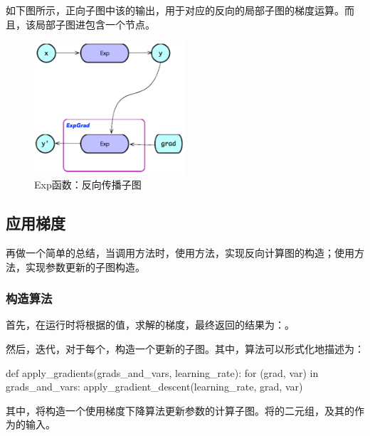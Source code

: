 \begin{content}
如下图所示，正向子图中该的输出，用于对应的反向的局部子图的梯度运算。而且，该局部子图进包含一个节点。

\begin{figure}[!h]
\centering
\includegraphics[width=0.5\textwidth]{figures/bp-exp-backward-graph.png}
\caption{Exp函数：反向传播子图}
 \label{fig:bp-exp-backward-graph}
\end{figure}

\subsection{应用梯度}

再做一个简单的总结，当调用方法时，使用方法，实现反向计算图的构造；使用方法，实现参数更新的子图构造。

\subsubsection{构造算法}

首先，在运行时将根据的值，求解的梯度，最终返回的结果为：。

然后，迭代，对于每个，构造一个更新的子图。其中，算法可以形式化地描述为：

\begin{leftbar}
\begin{python}
def apply_gradients(grads_and_vars, learning_rate):
  for (grad, var) in grads_and_vars:
    apply_gradient_descent(learning_rate, grad, var)
\end{python}
\end{leftbar}

其中，将构造一个使用梯度下降算法更新参数的计算子图。将的二元组，及其的作为的输入。


\end{content}

